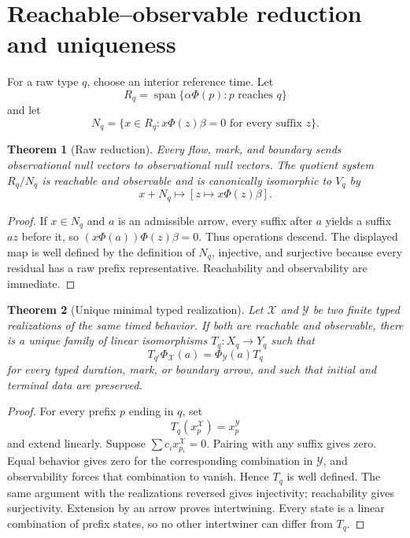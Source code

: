\documentclass[11pt]{article}
\newtheorem{theorem}{Theorem}[section]
\begin{document}
\section{Reachable--observable reduction and uniqueness}

For a raw type $q$, choose an interior reference time.  Let
\[
R_q=\operatorname{span}\{\alpha\Phi(p):p\text{ reaches }q\}
\]
and let
\[
N_q=\{x\in R_q:x\Phi(z)\beta=0\text{ for every suffix }z\}.
\]

\begin{theorem}[Raw reduction]
\label{thm:raw-reduction}
Every flow, mark, and boundary sends observational null vectors to observational null vectors.  The quotient system $R_q/N_q$ is reachable and observable and is canonically isomorphic to $V_q$ by
\[
x+N_q\longmapsto[z\mapsto x\Phi(z)\beta].
\]
\end{theorem}

\begin{proof}
If $x\in N_q$ and $a$ is an admissible arrow, every suffix after $a$ yields a suffix $az$ before it, so $(x\Phi(a))\Phi(z)\beta=0$.  Thus operations descend.  The displayed map is well defined by the definition of $N_q$, injective, and surjective because every residual has a raw prefix representative.  Reachability and observability are immediate.
\end{proof}

\begin{theorem}[Unique minimal typed realization]
\label{thm:unique-minimal}
Let $\mathcal X$ and $\mathcal Y$ be two finite typed realizations of the same timed behavior.  If both are reachable and observable, there is a unique family of linear isomorphisms $T_q:X_q\to Y_q$ such that
\[
T_{q'}\Phi_{\mathcal X}(a)=\Phi_{\mathcal Y}(a)T_q
\]
for every typed duration, mark, or boundary arrow, and such that initial and terminal data are preserved.
\end{theorem}

\begin{proof}
For every prefix $p$ ending in $q$, set
\[
T_q(x_p^{\mathcal X})=x_p^{\mathcal Y}
\]
and extend linearly.  Suppose $\sum c_ix_{p_i}^{\mathcal X}=0$.  Pairing with any suffix gives zero.  Equal behavior gives zero for the corresponding combination in $\mathcal Y$, and observability forces that combination to vanish.  Hence $T_q$ is well defined.  The same argument with the realizations reversed gives injectivity; reachability gives surjectivity.  Extension by an arrow proves intertwining.  Every state is a linear combination of prefix states, so no other intertwiner can differ from $T_q$.
\end{proof}
\end{document}
